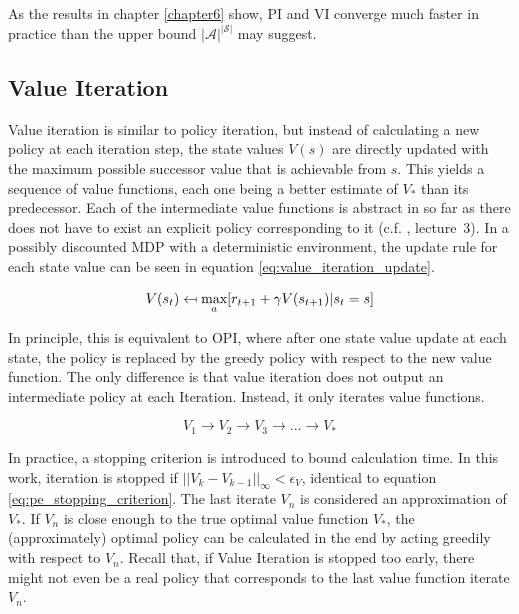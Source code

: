 As the results in chapter \ref{chapter6} show, PI and VI converge much faster in practice than the upper bound $|\mathcal{A}|^{|\mathcal{S}|}$ may suggest.


\subsection{Value Iteration}
\label{subsection:VI}
Value iteration is similar to policy iteration, but instead of calculating a new policy at each iteration step, the state values $V(s)$ are directly updated with the maximum possible successor value that is achievable from $s$. This yields a sequence of value functions, each one being a better estimate of $V_*$ than its predecessor. Each of the intermediate value functions is abstract in so far as there does not have to exist an explicit policy corresponding to it (c.f. \cite{Silver2015}, lecture~3). In a possibly discounted MDP with a deterministic environment, the update rule for each state value can be seen in equation \ref{eq:value_iteration_update}.

\begin{equation}
V(s_t) \mathrel{\reflectbox{\ensuremath{\mapsto}}} 
\underset{a}{\text{max}}[r_{t+1}+\gamma V(s_{t+1})|s_t=s]
\label{eq:value_iteration_update}
\end{equation}

In principle, this is equivalent to OPI, where after one state value update at each state, the policy is replaced by the greedy policy with respect to the new value function. The only difference is that value iteration does not output an intermediate policy at each Iteration. Instead, it only iterates value functions. 

\begin{equation*}
V_1 \longrightarrow V_2 \longrightarrow V_3 \longrightarrow ... \longrightarrow  V_*
\label{eq:vi_scheme}
\end{equation*}

In practice, a stopping criterion is introduced to bound calculation time. In this work, iteration is stopped if $||V_{k}-V_{k-1}||_\infty<\epsilon_V$, identical to equation \ref{eq:pe_stopping_criterion}. The last iterate $V_n$ is considered an approximation of $V_*$. If $V_n$ is close enough to the true optimal value function $V_*$, the (approximately) optimal policy can be calculated in the end by acting greedily with respect to $V_n$. Recall that, if Value Iteration is stopped too early, there might not even be a real policy that corresponds to the last value function iterate $V_n$.

